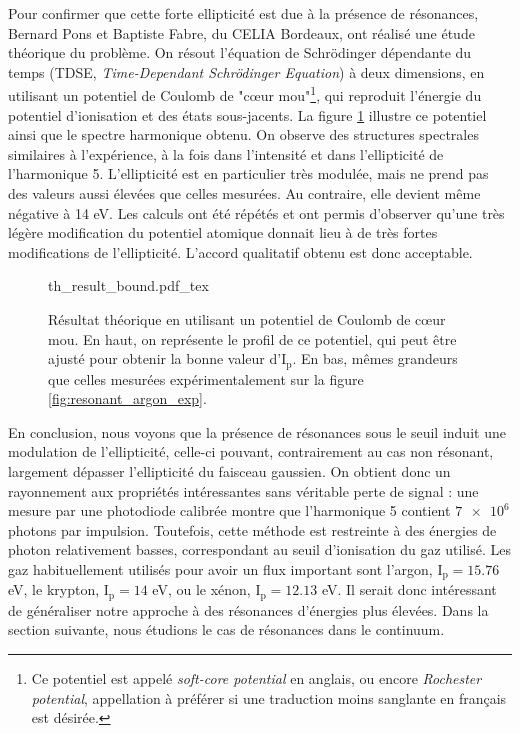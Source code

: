 Pour confirmer que cette forte ellipticité est due à la présence de résonances, Bernard Pons et Baptiste Fabre, du CELIA Bordeaux, ont réalisé une étude théorique du problème. On résout l'équation de Schrödinger dépendante du temps (TDSE, \textit{Time-Dependant Schrödinger Equation}) à deux dimensions, en utilisant un potentiel de Coulomb de "cœur mou"\footnote{Ce potentiel est appelé \textit{soft-core potential} en anglais, ou encore \textit{Rochester potential}, appellation à préférer si une traduction moins sanglante en français est désirée.}, qui reproduit l'énergie du potentiel d'ionisation et des états sous-jacents. La figure \ref{fig:resonant_argon_th_bound} illustre ce potentiel ainsi que le spectre harmonique obtenu. On observe des structures spectrales similaires à l'expérience, à la fois dans l'intensité et dans l'ellipticité de l'harmonique 5. L'ellipticité est en particulier très modulée, mais ne prend pas des valeurs aussi élevées que celles mesurées. Au contraire, elle devient même négative à 14 eV. Les calculs ont été répétés et ont permis d'observer qu'une très légère modification du potentiel atomique donnait lieu à de très fortes modifications de l'ellipticité. L'accord qualitatif obtenu est donc acceptable.

\begin{figure}[!ht]
\centering
\def\svgwidth{1\columnwidth}
{th_result_bound.pdf_tex}
\caption{Résultat théorique en utilisant un potentiel de Coulomb de cœur mou. En haut, on représente le profil de ce potentiel, qui peut être ajusté pour obtenir la bonne valeur d'$\text{I}_{\text{p}}$. En bas, mêmes grandeurs que celles mesurées expérimentalement sur la figure \ref{fig:resonant_argon_exp}.}
\label{fig:resonant_argon_th_bound}
\end{figure}
\newpage
En conclusion, nous voyons que la présence de résonances sous le seuil induit une modulation de l'ellipticité, celle-ci pouvant, contrairement au cas non résonant, largement dépasser l'ellipticité du faisceau gaussien. On obtient donc un rayonnement aux propriétés intéressantes sans véritable perte de signal : une mesure par une photodiode calibrée montre que l'harmonique 5 contient $\num{7e6}$ photons par impulsion. Toutefois, cette méthode est restreinte à des énergies de photon relativement basses, correspondant au seuil d'ionisation du gaz utilisé. Les gaz habituellement utilisés pour avoir un flux important sont l'argon, $\text{I}_{\text{p}}=15.76$ eV, le krypton, $\text{I}_{\text{p}}=14$ eV, ou le xénon, $\text{I}_{\text{p}}=12.13$ eV. Il serait donc intéressant de généraliser notre approche à des résonances d'énergies plus élevées. Dans la section suivante, nous étudions le cas de résonances dans le continuum.

